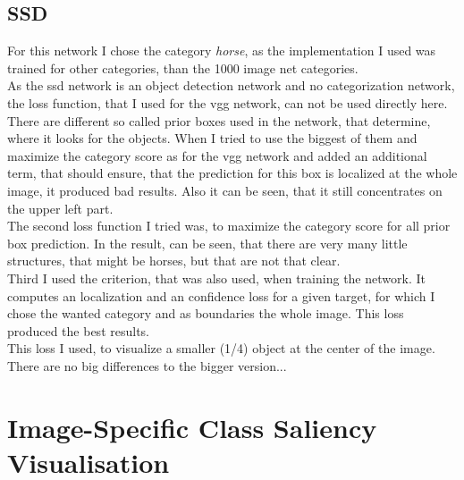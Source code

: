\documentclass[a4paper, 10pt, deutsch]{llncs}
\begin{document}
\subsection{SSD}

For this network I chose the category \textit{horse}, as the implementation I used was trained for other categories, than the 1000 image net categories.\\
As the ssd network is an object detection network and no categorization network, the loss function, that I used for the vgg network, can not be used directly here.
There are different so called prior boxes used in the network, that determine, where it looks for the objects. When I tried to use the biggest of them and maximize the category score as for the vgg network and added an additional term, that should ensure, that the prediction for this box is localized at the whole image, it produced bad results. Also it can be seen, that it still concentrates on the upper left part.\\
The second loss function I tried was, to maximize the category score for all prior box prediction. In the result, can be seen, that there are very many little structures, that might be horses, but that are not that clear.\\
Third I used the criterion, that was also used, when training the network. It computes an localization and an confidence loss for a given target, for which I chose the wanted category and as boundaries the whole image. This loss produced the best results.\\
This loss I used, to visualize a smaller (1/4) object at the center of the image. There are no big differences to the bigger version...


\section{Image-Specific Class Saliency Visualisation}
\label{sec:1}






\end{document}

